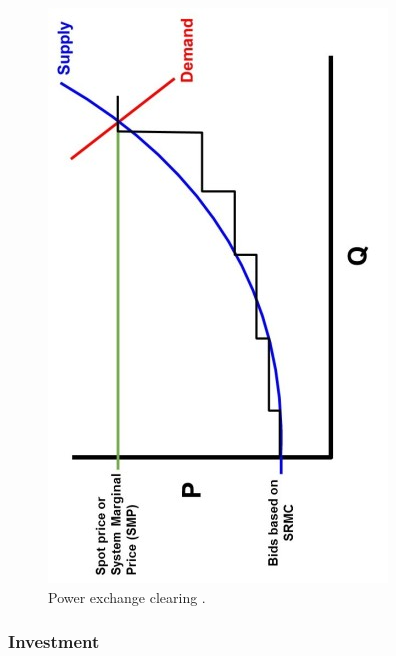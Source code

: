 \begin{figure}
 	\centering
 	\includegraphics[width=1\linewidth]{figures/power_market}
 	\caption{{\color{red}Power exchange clearing \cite{nuclear_economics_consulting_group_2019}.}}
 	\label{fig:powermarket}
\end{figure}

\subsubsection{Investment}

